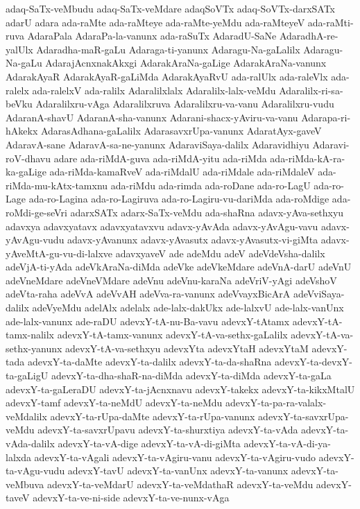 {adaq-SaTx-veMbudu
adaq-SaTx-veMdare
adaqSoVTx
adaq-SoVTx-darxSATx
adarU
adara
ada-raMte
ada-raMteye
ada-raMte-yeMdu
ada-raMteyeV
ada-raMti-ruva
AdaraPala
AdaraPa-la-vanunx
ada-raSuTx
AdaradU-SaNe
AdaradhA-re-yalUlx
Adaradha-maR-gaLu
Adaraga-ti-yanunx
Adaragu-Na-gaLalilx
Adaragu-Na-gaLu
AdarajAcnxnakAkxgi
AdarakAraNa-gaLige
AdarakAraNa-vanunx
AdarakAyaR
AdarakAyaR-gaLiMda
AdarakAyaRvU
ada-ralUlx
ada-raleVlx
ada-ralelx
ada-ralelxV
ada-ralilx
Adaralilxlalx
Adaralilx-lalx-veMdu
Adaralilx-ri-sa-beVku
Adaralilxru-vAga
Adaralilxruva
Adaralilxru-va-vanu
Adaralilxru-vudu
AdaranA-shavU
AdaranA-sha-vanunx
Adarani-shacx-yAviru-va-vanu
Adarapa-ri-hAkekx
AdarasAdhana-gaLalilx
AdarasavxrUpa-vanunx
AdaratAyx-gaveV
AdaravA-sane
AdaravA-sa-ne-yanunx
AdaraviSaya-dalilx
Adaravidhiyu
Adaravi-roV-dhavu
adare
ada-riMdA-guva
ada-riMdA-yitu
ada-riMda
ada-riMda-kA-ra-ka-gaLige
ada-riMda-kamaRveV
ada-riMdalU
ada-riMdale
ada-riMdaleV
ada-riMda-mu-kAtx-tamxnu
ada-riMdu
ada-rimda
ada-roDane
ada-ro-LagU
ada-ro-Lage
ada-ro-Lagina
ada-ro-Lagiruva
ada-ro-Lagiru-vu-dariMda
ada-roMdige
ada-roMdi-ge-seVri
adarxSATx
adarx-SaTx-veMdu
ada-shaRna
adavx-yAva-sethxyu
adavxya
adavxyatavx
adavxyatavxvu
adavx-yAvAda
adavx-yAvAgu-vavu
adavx-yAvAgu-vudu
adavx-yAvanunx
adavx-yAvasutx
adavx-yAvasutx-vi-giMta
adavx-yAveMtA-gu-vu-di-lalxve
adavxyaveV
ade
adeMdu
adeV
adeVdeVsha-dalilx
adeVjA-ti-yAda
adeVkAraNa-diMda
adeVke
adeVkeMdare
adeVnA-darU
adeVnU
adeVneMdare
adeVneVMdare
adeVnu
adeVnu-karaNa
adeVriV-yAgi
adeVshoV
adeVta-raha
adeVvA
adeVvAH
adeVva-ra-vanunx
adeVvayxBicArA
adeVviSaya-dalilx
adeVyeMdu
adelAlx
adelalx
ade-lalx-dakUkx
ade-lalxvU
ade-lalx-vanUnx
ade-lalx-vanunx
ade-raDU
adevxY-tA-nu-Ba-vavu
adevxY-tAtamx
adevxY-tA-tamx-nalilx
adevxY-tA-tamx-vanunx
adevxY-tA-va-sethx-gaLalilx
adevxY-tA-va-sethx-yanunx
adevxY-tA-va-sethxyu
adevxYta
adevxYtaH
adevxYtaM
adevxY-tada
adevxY-ta-daMte
adevxY-ta-dalilx
adevxY-ta-da-shaRna
adevxY-ta-devxY-ta-gaLigU
adevxY-ta-dha-shaR-na-diMda
adevxY-ta-diMda
adevxY-ta-gaLa
adevxY-ta-gaLeraDU
adevxY-ta-jAcnxnavu
adevxY-takekx
adevxY-ta-kikxMtalU
adevxY-tamf
adevxY-ta-neMdU
adevxY-ta-neMdu
adevxY-ta-pa-ra-valalx-veMdalilx
adevxY-ta-rUpa-daMte
adevxY-ta-rUpa-vanunx
adevxY-ta-savxrUpa-veMdu
adevxY-ta-savxrUpavu
adevxY-ta-shurxtiya
adevxY-ta-vAda
adevxY-ta-vAda-dalilx
adevxY-ta-vA-dige
adevxY-ta-vA-di-giMta
adevxY-ta-vA-di-ya-lalxda
adevxY-ta-vAgali
adevxY-ta-vAgiru-vanu
adevxY-ta-vAgiru-vudo
adevxY-ta-vAgu-vudu
adevxY-tavU
adevxY-ta-vanUnx
adevxY-ta-vanunx
adevxY-ta-veMbuva
adevxY-ta-veMdarU
adevxY-ta-veMdathaR
adevxY-ta-veMdu
adevxY-taveV
adevxY-ta-ve-ni-side
adevxY-ta-ve-nunx-vAga
}
